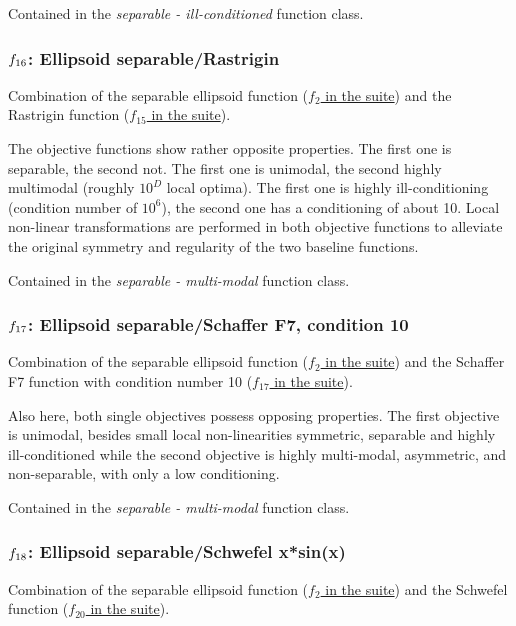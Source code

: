 \documentclass[letterpaper,12pt,english]{article}
\begin{document}
Contained in the \emph{separable - ill-conditioned} function class.


\subsubsection{\protect\(f_{16}\protect\): Ellipsoid separable/Rastrigin}
\label{index:ellipsoid-separable-rastrigin}\label{index:f16}
Combination of the separable ellipsoid function (\href{http://coco.lri.fr/downloads/download15.03/bbobdocfunctions.pdf\#page=10}{\(f_2\) in the  suite}) and the Rastrigin function (\href{http://coco.lri.fr/downloads/download15.03/bbobdocfunctions.pdf\#page=75}{\(f_{15}\) in the  suite}).

The objective functions show rather opposite properties.
The first one is separable, the second not. The first one
is unimodal, the second highly multimodal (roughly \(10^D\) local
optima). The first one is highly ill-conditioning (condition number of
\(10^6\)), the second one has a conditioning of about 10. Local
non-linear transformations are performed in both objective functions
to alleviate the original symmetry and regularity of the two
baseline functions.

Contained in the \emph{separable - multi-modal} function class.


\subsubsection{\protect\(f_{17}\protect\): Ellipsoid separable/Schaffer F7, condition 10}
\label{index:ellipsoid-separable-schaffer-f7-condition-10}\label{index:f17}
Combination of the separable ellipsoid function (\href{http://coco.lri.fr/downloads/download15.03/bbobdocfunctions.pdf\#page=10}{\(f_2\) in the  suite}) and the Schaffer F7 function with condition number 10
(\href{http://coco.lri.fr/downloads/download15.03/bbobdocfunctions.pdf\#page=85}{\(f_{17}\) in the  suite}).

Also here, both single objectives possess opposing properties.
The first objective is unimodal, besides small local non-linearities symmetric,
separable and highly ill-conditioned while the second objective is highly
multi-modal, asymmetric, and non-separable, with only a low conditioning.

Contained in the \emph{separable - multi-modal} function class.


\subsubsection{\protect\(f_{18}\protect\): Ellipsoid separable/Schwefel x*sin(x)}
\label{index:ellipsoid-separable-schwefel-x-sin-x}\label{index:f18}
Combination of the separable ellipsoid function (\href{http://coco.lri.fr/downloads/download15.03/bbobdocfunctions.pdf\#page=10}{\(f_2\) in the  suite}) and the Schwefel function (\href{http://coco.lri.fr/downloads/download15.03/bbobdocfunctions.pdf\#page=100}{\(f_{20}\) in the  suite}).
\end{document}
